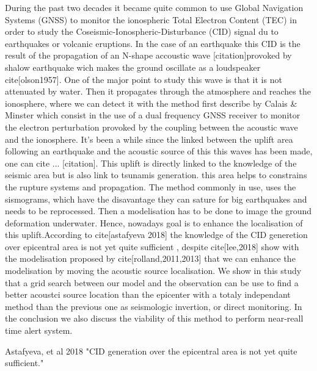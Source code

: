 \documentclass{gji}
\begin{document}
During the past two decades it became quite common to use Global Navigation Systems (GNSS) to monitor the ionospheric Total Electron Content (TEC) in order to study the Coseismic-Ionospheric-Disturbance (CID) signal du to earthquakes or volcanic eruptions. In the case of an earthquake this CID is the result of the propagation of an N-shape accoustic wave [citation]provoked by shalow earthquake wich makes the ground oscillate as a loudspeaker cite[olson1957]. One of the major point to study this wave is that it is not attenuated by water. Then it propagates through the atmosphere and reaches the ionosphere, where we can detect it with the method first describe by Calais \& Minster  which consist in the use of a dual frequency GNSS receiver to monitor the electron perturbation provoked by the coupling between the acoustic wave and the ionosphere. It's been a while since the linked between the uplift area following an earthquake and the acoustic source of this this waves has been made, one can cite ... [citation]. This uplift is directly linked to the knowledge of the seismic area but is also link to tsunamis generation. this area helps to constrains the rupture systems and propagation. The method commonly in use, uses the sismograms, which have the disavantage they can sature \WM for big earthquakes and needs to be reprocessed. Then a modelisation has to be done to image the ground deformation underwater. Hence, nowadays goal is to enhance the localisation of this uplift.According to cite[astafyeva 2018] the knowledge of the CID generetion over epicentral area is not yet quite sufficient  , despite cite[lee,2018] show with the modelisation proposed by cite[rolland,2011,2013] that we can enhance the modelisation by moving the acoustic source localisation. We show in this study that a grid search between our model and the observation can be use to find a better acoustci source location than the epicenter with a totaly independant method than the previous one as seismologic invertion, or direct monitoring. In the conclusion we also discuss the viability of this method to perform near-reall time alert system.

Astafyeva, et al 2018 "CID generation over the epicentral area is not yet quite sufficient."
\end{document}

